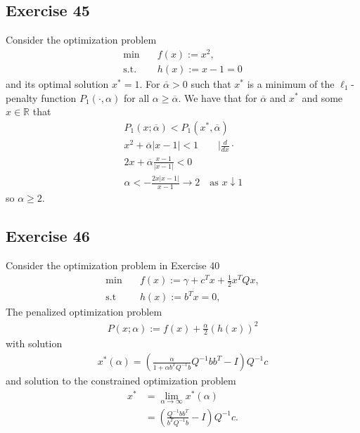 \subsection{Exercise 45}
Consider the optimization problem
\begin{align}
    \text{min}\quad &f(x) := x^{2},\\
    \text{s.t.}\quad & h(x) := x-1= 0 \nonumber
\end{align}
and its optimal solution $x^{*}=1$. For $\overline{\alpha}>0$ such that
$x^{*}$ is a minimum of the $\ell_1$-penalty function $P_1(\cdot, \alpha)$
for all $\alpha \ge \overline{\alpha}$.
We have that for $\overline{\alpha}$ and $x^{*}$ and some $x \in \mathbb{R}$ that
\begin{align}
   &P_1(x;\overline{\alpha}) < P_1(x^{*},\overline{\alpha})\\
   &x^{2} + \overline{\alpha} |x-1| < 1  \qquad \big|\frac{d}{dx}\cdot\\
   &2x + \overline{\alpha} \frac{x-1}{|x-1|} < 0\\
   &\alpha < -\frac{2x|x-1|}{x-1} \longrightarrow 2 \quad \text{as
   $x\downarrow 1$ }
\end{align}
so $\alpha \ge 2$.
\subsection{Exercise 46}
Consider the optimization problem in Exercise 40
\begin{align}
    \min \quad &f(x):=\gamma + c^{T}x + \frac{1}{2}x^{T}Qx, \label{eq: opp}\\
    \text{s.t}\quad &h(x) := b^{T}x = 0, \nonumber
\end{align}
The penalized optimization problem
\begin{align}
    P(x;\alpha) := f(x) + \frac{\alpha}{2}\left( h(x) \right)^{2}
\end{align}
with solution
\begin{align}
    x^{*}(\alpha) = \left( \frac{\alpha}{1+\alpha b^{T}Q^{-1}b}Q^{-1} bb^{T}
    -I\right) Q^{-1} c
\end{align}
and solution to the constrained optimization problem
\begin{align}
    x^{*} &= \lim_{\alpha \to \infty}x^{*}(\alpha)\\
          &= \left(\frac{Q^{-1}bb^{T}}{b^{T}Q^{-1}b} -I \right) Q^{-1} c.
\end{align}
